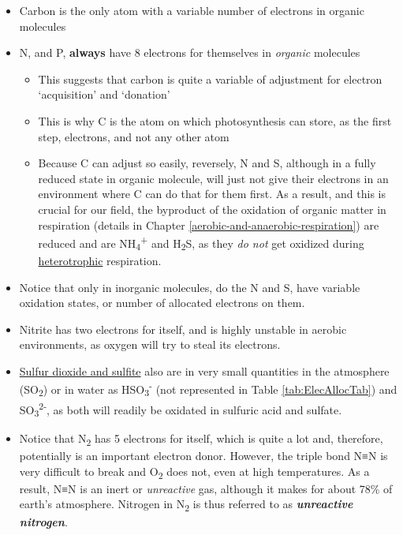 \documentclass[]{book}
\providecommand{\tightlist}{%
  \setlength{\itemsep}{0pt}\setlength{\parskip}{0pt}}
\theoremstyle{definition}
\theoremstyle{definition}
\theoremstyle{definition}
\theoremstyle{remark}
\begin{document}
\begin{itemize}
\tightlist
\item
  Carbon is the only atom with a variable number of electrons in organic
  molecules
\item
  N, and P, \textbf{always} have 8 electrons for themselves in
  \emph{organic} molecules

  \begin{itemize}
  \tightlist
  \item
    This suggests that carbon is quite a variable of adjustment for
    electron `acquisition' and `donation'
  \item
    This is why C is the atom on which photosynthesis can store, as the
    first step, electrons, and not any other atom
  \item
    Because C can adjust so easily, reversely, N and S, although in a
    fully reduced state in organic molecule, will just not give their
    electrons in an environment where C can do that for them first. As a
    result, and this is crucial for our field, the byproduct of the
    oxidation of organic matter in respiration (details in Chapter
    \ref{aerobic-and-anaerobic-respiration}) are reduced and are
    NH\textsubscript{4}\textsuperscript{+} and H\textsubscript{2}S, as
    they \emph{do not} get oxidized during
    \protect\hyperlink{trophic-names}{heterotrophic} respiration.
  \end{itemize}
\item
  Notice that only in inorganic molecules, do the N and S, have variable
  oxidation states, or number of allocated electrons on them.
\item
  Nitrite has two electrons for itself, and is highly unstable in
  aerobic environments, as oxygen will try to steal its electrons.
\item
  \protect\hyperlink{sulfites}{Sulfur dioxide and sulfite} also are in
  very small quantities in the atmosphere (SO\textsubscript{2}) or in
  water as HSO\textsubscript{3}\textsuperscript{-} (not represented in
  Table \ref{tab:ElecAllocTab}) and
  SO\textsubscript{3}\textsuperscript{2-}, as both will readily be
  oxidated in sulfuric acid and sulfate.
\item
  Notice that N\textsubscript{2} has 5 electrons for itself, which is
  quite a lot and, therefore, potentially is an important electron
  donor. However, the triple bond N≡N is very difficult to break and
  O\textsubscript{2} does not, even at high temperatures. As a result,
  N≡N is an inert or \emph{unreactive} gas, although it makes for about
  78\% of earth's atmosphere. Nitrogen in N\textsubscript{2} is thus
  referred to as \textbf{\emph{unreactive nitrogen}}.
\end{itemize}
\end{document}
